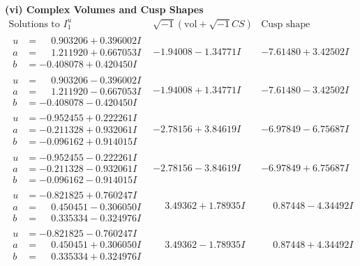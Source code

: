 \documentclass[1p]{elsarticle_modified}
\theoremstyle{definition}
\newcommand{\I}{\sqrt{-1}}
\begin{document}
\newpage\flushleft \textbf{(vi) Complex Volumes and Cusp Shapes}
$$\begin{array}{c|c|c}  
\text{Solutions to }I^u_{1}& \I (\text{vol} + \sqrt{-1}CS) & \text{Cusp shape}\\
 \hline 
\begin{aligned}
u &= \phantom{-}0.903206 + 0.396002 I \\
a &= \phantom{-}1.211920 + 0.667053 I \\
b &= -0.408078 + 0.420450 I\end{aligned}
 & -1.94008 - 1.34771 I & -7.61480 + 3.42502 I \\ \hline\begin{aligned}
u &= \phantom{-}0.903206 - 0.396002 I \\
a &= \phantom{-}1.211920 - 0.667053 I \\
b &= -0.408078 - 0.420450 I\end{aligned}
 & -1.94008 + 1.34771 I & -7.61480 - 3.42502 I \\ \hline\begin{aligned}
u &= -0.952455 + 0.222261 I \\
a &= -0.211328 + 0.932061 I \\
b &= -0.096162 + 0.914015 I\end{aligned}
 & -2.78156 + 3.84619 I & -6.97849 - 6.75687 I \\ \hline\begin{aligned}
u &= -0.952455 - 0.222261 I \\
a &= -0.211328 - 0.932061 I \\
b &= -0.096162 - 0.914015 I\end{aligned}
 & -2.78156 - 3.84619 I & -6.97849 + 6.75687 I \\ \hline\begin{aligned}
u &= -0.821825 + 0.760247 I \\
a &= \phantom{-}0.450451 - 0.306050 I \\
b &= \phantom{-}0.335334 - 0.324976 I\end{aligned}
 & \phantom{-}3.49362 + 1.78935 I & \phantom{-}0.87448 - 4.34492 I \\ \hline\begin{aligned}
u &= -0.821825 - 0.760247 I \\
a &= \phantom{-}0.450451 + 0.306050 I \\
b &= \phantom{-}0.335334 + 0.324976 I\end{aligned}
 & \phantom{-}3.49362 - 1.78935 I & \phantom{-}0.87448 + 4.34492 I \\ \hline\begin{aligned}

\end{aligned}
\end{array}$$
\end{document}
